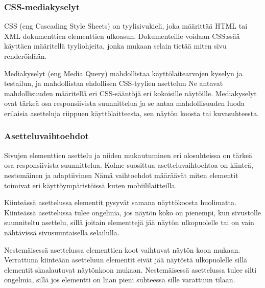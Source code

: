 \documentclass[11pt,a4paper,titlepage,oneside]{article}
\begin{document}
\subsubsection{CSS-mediakyselyt}



CSS (eng Cascading Style Sheets) on tyylisivukieli, joka määrittää HTML tai XML dokumenttien elementtien ulkoasun.
Dokumenteille voidaan CSS:ssää käyttäen määritellä tyyliohjeita, jonka mukaan selain tietää miten sivu renderöidään.
\medskip




Mediakyselyt (eng Media Query) mahdollistaa käyttölaitearvojen kyselyn ja testailun,
ja mahdollistaa ehdollisen CSS-tyylien asettelun
Ne antavat mahdollisuuden määritellä eri CSS-sääntöjä eri kokoisille näytöille. 
Mediakyselyt ovat tärkeä osa responsiivista suunnittelua ja se antaa mahdollisuuden luoda erilaisia asetteluja riippuen käyttölaitteesta,
sen näytön koosta tai kuvasuhteesta.












\subsubsection{Asetteluvaihtoehdot}





Sivujen elementtien asettelu ja niiden mukautuminen eri olosuhteissa on tärkeä osa responsiivista suunnittelua.
Kolme suosittua asetteluvaihtoehtoa on kiinteä, nestemäinen ja adaptiivinen
Nämä vaihtoehdot määräävät miten elementit toimivat eri käyttöympäristöissä kuten mobiililaitteilla.
\medskip



Kiinteässä asettelussa elementit pysyvät samana näyttökoosta huolimatta. 
Kiinteässä asettelussa tulee ongelmia, jos näytön koko on pienempi, kun sivustolle suunniteltu asettelu, 
sillä joitain elementtejä jää näytön ulkopuolelle tai on vain nähtävissä sivusuuntaisella selailulla.
\medskip


Nestemäisessä asettelussa elementtien koot vaihtuvat näytön koon mukaan. 
Verrattuna kiinteään asetteluun elementit eivät jää näytöstä ulkopuolelle sillä elementit skaalautuvat näytönkoon mukaan.
Nestemäisessä asettelussa tulee silti ongelmia, sillä jos elementti on liian pieni suhteessa sille varattuun tilaan.
\medskip
\end{document}
